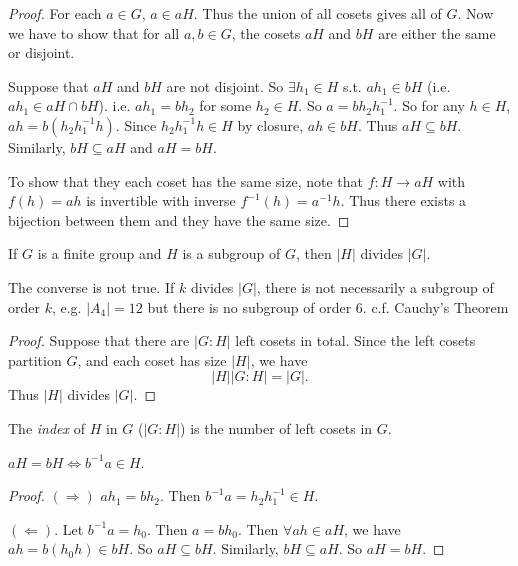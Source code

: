 \documentclass[a4paper]{article}
\begin{document}
  \begin{proof}
    For each $a\in G$, $a\in aH$. Thus the union of all cosets gives all of $G$. Now we have to show that for all $a, b\in G$, the cosets $aH$ and $bH$ are either the same or disjoint.

    Suppose that $aH$ and $bH$ are not disjoint. So $\exists h_1\in H$ s.t. $ah_1\in bH$ (i.e. $ah_1\in aH\cap bH$). i.e. $ah_1 = bh_2$ for some $h_2\in H$. So $a = bh_2h_1^{-1}$. So for any $h\in H$, $ah = b(h_2h_1^{-1}h)$. Since $h_2h_1^{-1}h\in H$ by closure, $ah\in bH$. Thus $aH\subseteq bH$. Similarly, $bH\subseteq aH$ and $aH = bH$.

    To show that they each coset has the same size, note that $f: H \to aH$ with $f(h) = ah$ is invertible with inverse $f^{-1}(h) = a^{-1}h$. Thus there exists a bijection between them and they have the same size.
  \end{proof}

  \begin{thm}
    If $G$ is a finite group and $H$ is a subgroup of $G$, then $|H|$ divides $|G|$.
  \end{thm}
  \note The converse is not true. If $k$ divides $|G|$, there is not necessarily a subgroup of order $k$, e.g. $|A_4| = 12$ but there is no subgroup of order $6$. c.f. Cauchy's Theorem

  \begin{proof}
    Suppose that there are $|G: H|$ left cosets in total. Since the left cosets partition $G$, and each coset has size $|H|$, we have
    \[
      |H||G:H| = |G|.
    \]
    Thus $|H|$ divides $|G|$.
  \end{proof}

  \begin{defi}
    The \emph{index} of $H$ in $G$ ($|G:H|$) is the number of left cosets in $G$. 
  \end{defi}

  \begin{prop}
    $aH = bH \Leftrightarrow b^{-1}a\in H$.
  \end{prop}
  \begin{proof}
    $(\Rightarrow)$ $ah_1 = bh_2$. Then $b^{-1}a = h_2h_1^{-1}\in H$.

    $(\Leftarrow)$. Let $b^{-1}a = h_0$. Then $a = bh_0$. Then $\forall ah\in aH$, we have $ah = b(h_0h)\in bH$. So $aH \subseteq bH$. Similarly, $bH\subseteq aH$. So $aH = bH$.
  \end{proof}
\end{document}
